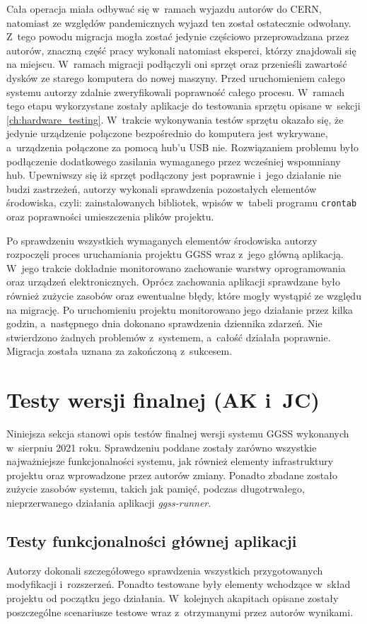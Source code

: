 Cała operacja miała odbywać się w~ramach wyjazdu autorów do CERN, natomiast ze względów pandemicznych wyjazd ten został ostatecznie odwołany. Z~tego powodu migracja mogła zostać jedynie częściowo przeprowadzana przez autorów, znaczną część pracy wykonali natomiast eksperci, którzy znajdowali się na miejscu. W~ramach migracji podłączyli oni sprzęt oraz przenieśli zawartość dysków ze starego komputera do nowej maszyny. Przed uruchomieniem całego systemu autorzy zdalnie zweryfikowali poprawność całego procesu. W~ramach tego etapu wykorzystane zostały aplikacje do testowania sprzętu opisane w~sekcji \ref{ch:hardware_testing}. W~trakcie wykonywania testów sprzętu okazało się, że jedynie urządzenie połączone bezpośrednio do komputera jest wykrywane, a~urządzenia połączone za pomocą hub'u USB nie. Rozwiązaniem problemu było podłączenie dodatkowego zasilania wymaganego przez wcześniej wspomniany hub. Upewniwszy się iż sprzęt podłączony jest poprawnie i~jego działanie nie budzi zastrzeżeń, autorzy wykonali sprawdzenia pozostałych elementów środowiska, czyli: zainstalowanych bibliotek, wpisów w~tabeli programu \lstinline{crontab} oraz poprawności umieszczenia plików projektu.

Po sprawdzeniu wszystkich wymaganych elementów środowiska autorzy rozpoczęli proces uruchamiania projektu GGSS wraz z~jego główną aplikacją. W~jego trakcie dokładnie monitorowano zachowanie warstwy oprogramowania oraz urządzeń elektronicznych. Oprócz zachowania aplikacji sprawdzane było również zużycie zasobów oraz ewentualne błędy, które mogły wystąpić ze względu na migrację. Po uruchomieniu projektu monitorowano jego działanie przez kilka godzin, a~następnego dnia dokonano sprawdzenia dziennika zdarzeń. Nie stwierdzono żadnych problemów z~systemem, a~całość działała poprawnie. Migracja została uznana za zakończoną z~sukcesem.

\section{Testy wersji finalnej (AK i~JC)}
Niniejsza sekcja stanowi opis testów finalnej wersji systemu GGSS wykonanych w~sierpniu 2021 roku. Sprawdzeniu poddane zostały zarówno wszystkie najważniejsze funkcjonalności systemu, jak również elementy infrastruktury projektu oraz wprowadzone przez autorów zmiany. Ponadto zbadane zostało zużycie zasobów systemu, takich jak pamięć, podczas długotrwałego, nieprzerwanego działania aplikacji \emph{ggss-runner}. 

\subsection{Testy funkcjonalności głównej aplikacji}
Autorzy dokonali szczegółowego sprawdzenia wszystkich przygotowanych modyfikacji i~rozszerzeń. Ponadto testowane były elementy wchodzące w~skład projektu od początku jego działania. W~kolejnych akapitach opisane zostały poszczególne scenariusze testowe wraz z~otrzymanymi przez autorów wynikami.

